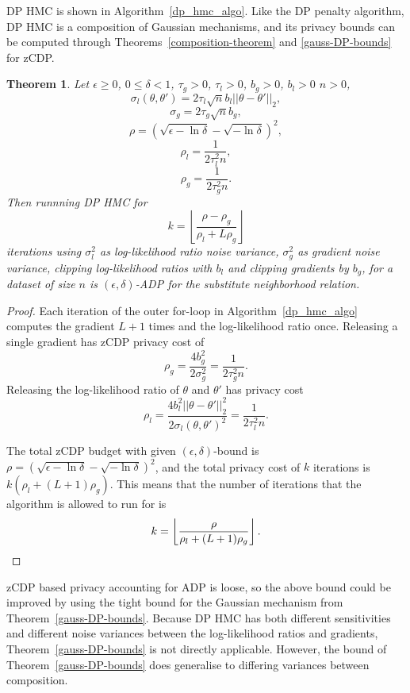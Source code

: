 \documentclass[english,twoside,openright]{HYgraduMLDS}
\newtheorem{theorem}[lemma]{Theorem}
\begin{document}
DP HMC is shown in Algorithm~\ref{dp_hmc_algo}.
Like the DP penalty algorithm, DP HMC is a composition of Gaussian mechanisms,
and its privacy bounds can be computed through Theorems~\ref{composition-theorem}
and \ref{gauss-DP-bounds} for zCDP.

\begin{theorem}\label{dp_hmc_theorem_zcdp}
  Let \(\epsilon \geq 0\), \(0 \leq \delta < 1\), \(\tau_{g} > 0\), \(\tau_{l} > 0\),
  \(b_{g} > 0\), \(b_{l} > 0\) \(n > 0\),
  \[\sigma_l(\theta, \theta') = 2\tau_l\sqrt{n}b_l||\theta - \theta'||_2,\]
  \[\sigma_g = 2\tau_g\sqrt{n}b_g,\]
  \[
    \rho = \left(\sqrt{\epsilon - \ln \delta} - \sqrt{-\ln \delta}\right)^2,
  \]
  \[
    \rho_l = \frac{1}{2\tau_l^2n},
  \]
  \[
    \rho_g = \frac{1}{2\tau_g^2n}.
  \]
  Then runnning DP HMC for
  \[
    k = \left\lfloor\frac{\rho - \rho_{g}}{\rho_l + L\rho_g}\right\rfloor
  \]
  iterations using \(\sigma_{l}^{2}\) as log-likelihood ratio noise variance,
  \(\sigma_{g}^{2}\) as gradient noise variance, clipping log-likelihood ratios
  with \(b_{l}\) and clipping gradients by \(b_{g}\), for a dataset of size \(n\)
  is \((\epsilon, \delta)\)-ADP for the substitute neighborhood relation.
\end{theorem}
\begin{proof}
  Each iteration of the outer for-loop in Algorithm~\ref{dp_hmc_algo}
  computes the gradient \(L + 1\) times and
  the log-likelihood ratio once. Releasing a single gradient has zCDP privacy
  cost of
  \[
    \rho_g = \frac{4b_g^2}{2\sigma_g^2} = \frac{1}{2\tau_g^2n}.
  \]
  Releasing the log-likelihood ratio of \(\theta\) and \(\theta'\) has privacy cost
  \[
    \rho_l = \frac{4b_l^2||\theta - \theta'||_2^2}{2\sigma_l(\theta, \theta')^2} = \frac{1}{2\tau_l^2n}.
  \]

  The total zCDP budget with given \((\epsilon, \delta)\)-bound is
  \(\rho = \left(\sqrt{\epsilon - \ln \delta} - \sqrt{-\ln \delta}\right)^2\),
  and the total privacy cost of \(k\) iterations is \(k(\rho_{l} + (L + 1)\rho_{g})\).
  This means that the number of iterations that the algorithm is allowed to run for
  is
  \[
    k = \left\lfloor\frac{\rho}{\rho_l + (L + 1)\rho_g}\right\rfloor.
    \qedhere
  \]
\end{proof}

zCDP based privacy accounting for ADP is loose, so the above bound could be improved
by using the tight bound for the Gaussian mechanism from
Theorem~\ref{gauss-DP-bounds}. Because DP HMC has both
different sensitivities and different noise variances between the log-likelihood
ratios and gradients, Theorem~\ref{gauss-DP-bounds} is not directly applicable.
However, the bound of Theorem~\ref{gauss-DP-bounds} does generalise to differing
variances between composition.
\end{document}
